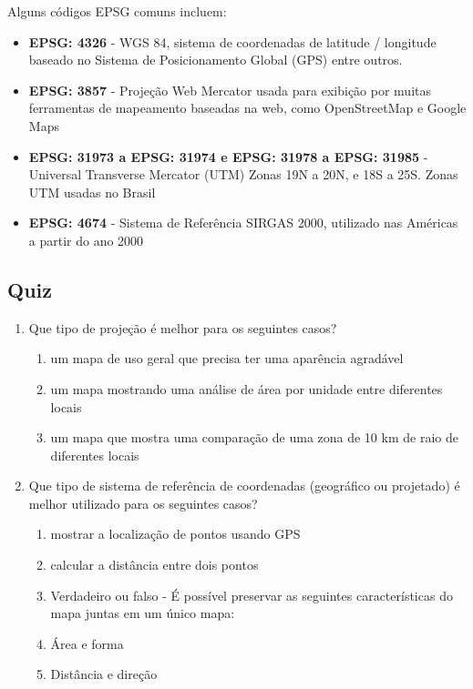 \documentclass[
]{krantz}
\providecommand{\tightlist}{%
  \setlength{\itemsep}{0pt}\setlength{\parskip}{0pt}}
\begin{document}
Alguns códigos EPSG comuns incluem:

\begin{itemize}
\tightlist
\item
  \textbf{EPSG: 4326} - WGS 84, sistema de coordenadas de latitude / longitude baseado no Sistema de Posicionamento Global (GPS) entre outros.
\item
  \textbf{EPSG: 3857} - Projeção Web Mercator usada para exibição por muitas ferramentas de mapeamento baseadas na web, como OpenStreetMap e Google Maps
\item
  \textbf{EPSG: 31973 a EPSG: 31974 e EPSG: 31978 a EPSG: 31985} - Universal Transverse Mercator (UTM) Zonas 19N a 20N, e 18S a 25S. Zonas UTM usadas no Brasil
\item
  \textbf{EPSG: 4674} - Sistema de Referência SIRGAS 2000, utilizado nas Américas a partir do ano 2000
\end{itemize}

\hypertarget{quiz}{%
\subsection{Quiz}\label{quiz}}

\begin{enumerate}
\def\labelenumi{\arabic{enumi}.}
\tightlist
\item
  Que tipo de projeção é melhor para os seguintes casos?

  \begin{enumerate}
  \def\labelenumii{\arabic{enumii}.}
  \tightlist
  \item
    um mapa de uso geral que precisa ter uma aparência agradável
  \item
    um mapa mostrando uma análise de área por unidade entre diferentes locais
  \item
    um mapa que mostra uma comparação de uma zona de 10 km de raio de diferentes locais
  \end{enumerate}
\item
  Que tipo de sistema de referência de coordenadas (geográfico ou projetado) é melhor utilizado para os seguintes casos?

  \begin{enumerate}
  \def\labelenumii{\arabic{enumii}.}
  \tightlist
  \item
    mostrar a localização de pontos usando GPS
  \item
    calcular a distância entre dois pontos
  \item
    Verdadeiro ou falso - É possível preservar as seguintes características do mapa juntas em um único mapa:
  \item
    Área e forma
  \item
    Distância e direção
  \end{enumerate}
\end{enumerate}
\end{document}
